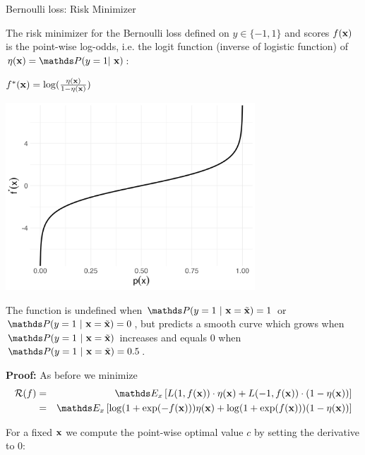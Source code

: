 \documentclass[11pt,compress,t,notes=noshow, xcolor=table]{beamer}
\begin{document}
\begin{vbframe}{Bernoulli loss: Risk Minimizer}
\begin{footnotesize}
\end{footnotesize}

\framebreak 

The risk minimizer for the Bernoulli loss defined on $y \in \{-1, 1\}$ and scores $f(\mathbf{x})$ is the point-wise log-odds, i.e. the logit function (inverse of logistic function) of $\eta(\xv) = \P(y=1|~\xv)$:

\begin{minipage}{0.3\textwidth} 
	\centering
	{$f^{\ast}(\mathbf{x}) =  \log (\frac{\eta(\mathbf{x}) }{1-\eta(\mathbf{x}) })$}
\end{minipage}
\hspace{-.03\textwidth}
\begin{minipage}{0.7\textwidth}
	\centering	
	\includegraphics[width=0.7\textwidth]{figure/logistic_inverse.png}
\end{minipage}

The function is undefined when $\P(y=1~|~\xv = \xtil) = 1$ or $\P(y=1~|~\xv = \xtil) = 0$, but predicts a smooth curve which grows when $\P(y=1~|~\xv = \xtil)$ increases and equals $0$ when $\P(y=1~|~\xv = \xtil) = 0.5$.

\framebreak 

\textbf{Proof: } As before we minimize 
\begin{eqnarray*}
  \riskf &=& \E_x \left[L(1, \fx) \cdot \eta(\xv) + L(-1, \fx) \cdot (1 - \eta(\xv)) \right] \\
  &=& \E_x \left[ \log(1 + \exp(- \fx)) \eta(\xv)+ \log(1 + \exp(\fx)) (1 - \eta(\xv)) \right] 
\end{eqnarray*}

For a fixed $\mathbf{x}$ we compute the point-wise optimal value $c$ by setting the derivative to $0$: 


\end{vbframe}
\end{document}

